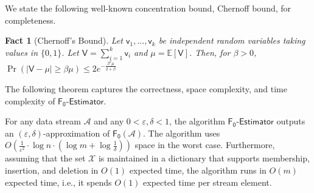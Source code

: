 \documentclass[a4paper,UKenglish,cleveref, autoref, thm-restate]{lipics-v2021}
\newcommand{\stream}{\mathcal{A}}
\newcommand{\hybrid}{\ensuremath{\mathsf{F_0\mbox{-}Estimator}}}
\newcommand{\Fo}{\ensuremath{\mathsf{F_0}}}
\newtheorem{fact}{Fact}[section]
\begin{document}
We state the following well-known concentration bound, Chernoff bound,  for completeness. 










\begin{fact} [Chernoff's Bound] 
Let $\mathsf{v}_1, ..., \mathsf{v}_k$ be independent random variables taking values in $\{0, 1\}$. Let $\mathsf{V} = \sum_{i=1}^k \mathsf{v}_i$ and $\mu = \mathbb{E}[\mathsf{V}]$. Then, for $\beta > 0$,  
$\Pr\left(\left|\mathsf{V} - \mu\right| \geq \beta \mu\right) \leq 2e^{-\frac{\beta^2\mu}{2+\beta}}$
\end{fact}

The following theorem captures the correctness, space complexity, and time complexity of {\hybrid}. 





























\begin{theorem}\label{thm:main}
For any data stream ${\stream}$ and any $0< \varepsilon, \delta <1 $, the algorithm $\hybrid$ outputs an $(\varepsilon,\delta)$-approximation of $\Fo({\stream})$. The algorithm uses $O(\frac{1}{\varepsilon^2}\cdot\log n \cdot (\log m + \log \frac{1}{\delta}))$ space in the worst case. Furthermore, assuming that the set $\mathcal{X}$ is maintained in a dictionary that supports membership, insertion, and deletion in $O(1)$ expected time, the algorithm runs in $O(m)$ expected time, i.e., it spends $O(1)$ expected time per stream element.
\end{theorem}
\end{document}
